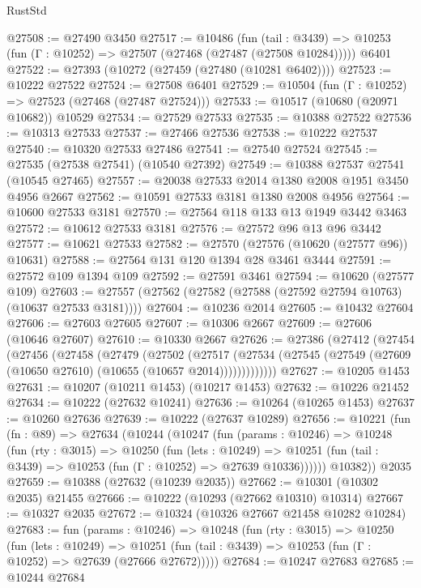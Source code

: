 \begin{lexlean}{RustStd}
\begin{coremodule}
@27508 := @27490 @3450
@27517 := @10486
    (fun (tail : @3439) => @10253 (fun (Γ : @10252) => @27507 (@27468 (@27487 (@27508 @10284)))))
    @6401
@27522 := @27393 (@10272 (@27459 (@27480 (@10281 @6402))))
@27523 := @10222 @27522
@27524 := @27508 @6401
@27529 := @10504 (fun (Γ : @10252) => @27523 (@27468 (@27487 @27524)))
@27533 := @10517 (@10680 (@20971 @10682)) @10529
@27534 := @27529 @27533
@27535 := @10388 @27522
@27536 := @10313 @27533
@27537 := @27466 @27536
@27538 := @10222 @27537
@27540 := @10320 @27533 @27486
@27541 := @27540 @27524
@27545 := @27535 (@27538 @27541) (@10540 @27392)
@27549 := @10388 @27537 @27541 (@10545 @27465)
@27557 := @20038 @27533 @2014 @1380 @2008 @1951 @3450 @4956 @2667
@27562 := @10591 @27533 @3181 @1380 @2008 @4956
@27564 := @10600 @27533 @3181
@27570 := @27564 @118 @133 @13 @1949 @3442 @3463
@27572 := @10612 @27533 @3181
@27576 := @27572 @96 @13 @96 @3442
@27577 := @10621 @27533
@27582 := @27570 (@27576 (@10620 (@27577 @96)) @10631)
@27588 := @27564 @131 @120 @1394 @28 @3461 @3444
@27591 := @27572 @109 @1394 @109
@27592 := @27591 @3461
@27594 := @10620 (@27577 @109)
@27603 := @27557 (@27562 (@27582 (@27588 (@27592 @27594 @10763) (@10637 @27533 @3181))))
@27604 := @10236 @2014
@27605 := @10432 @27604
@27606 := @27603 @27605
@27607 := @10306 @2667
@27609 := @27606 (@10646 @27607)
@27610 := @10330 @2667
@27626 := @27386
    (@27412
      (@27454
        (@27456
          (@27458
            (@27479
              (@27502
                (@27517
                  (@27534 (@27545 (@27549 (@27609 (@10650 @27610) (@10655 (@10657 @2014)))))))))))))
@27627 := @10205 @1453
@27631 := @10207 (@10211 @1453) (@10217 @1453)
@27632 := @10226 @21452
@27634 := @10222 (@27632 @10241)
@27636 := @10264 (@10265 @1453)
@27637 := @10260 @27636
@27639 := @10222 (@27637 @10289)
@27656 := @10221
    (fun (fn : @89) =>
    @27634
      (@10244
        (@10247
          (fun (params : @10246) =>
          @10248
            (fun (rty : @3015) =>
            @10250
              (fun (lets : @10249) =>
              @10251 (fun (tail : @3439) => @10253 (fun (Γ : @10252) => @27639 @10336))))))
        @10382))
    @2035
@27659 := @10388 (@27632 (@10239 @2035))
@27662 := @10301 (@10302 @2035) @21455
@27666 := @10222 (@10293 (@27662 @10310) @10314)
@27667 := @10327 @2035
@27672 := @10324 (@10326 @27667 @21458 @10282 @10284)
@27683 := fun (params : @10246) =>
  @10248
    (fun (rty : @3015) =>
    @10250
      (fun (lets : @10249) =>
      @10251 (fun (tail : @3439) => @10253 (fun (Γ : @10252) => @27639 (@27666 @27672)))))
@27684 := @10247 @27683
@27685 := @10244 @27684

\end{coremodule}
\end{lexlean}
